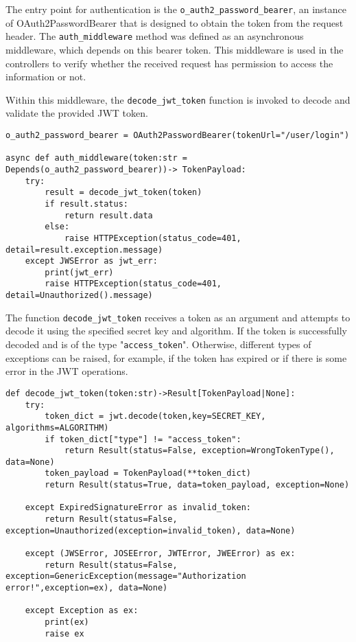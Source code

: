 The entry point for authentication is the \texttt{o\_auth2\_password\_bearer}, an instance of OAuth2PasswordBearer that is designed to obtain the token from the request header. The \texttt{auth\_middleware} method was defined as an asynchronous middleware, which depends on this bearer token. This middleware is used in the controllers to verify whether the received request has permission to access the information or not.

Within this middleware, the \texttt{decode\_jwt\_token} function is invoked to decode and validate the provided \gls{JWT} token.

\begin{Verbatim}[fontsize=\small, baselinestretch=0.6]
o_auth2_password_bearer = OAuth2PasswordBearer(tokenUrl="/user/login")

async def auth_middleware(token:str = Depends(o_auth2_password_bearer))-> TokenPayload:
    try:
        result = decode_jwt_token(token)
        if result.status:
            return result.data
        else:
            raise HTTPException(status_code=401, detail=result.exception.message)
    except JWSError as jwt_err:
        print(jwt_err)
        raise HTTPException(status_code=401, detail=Unauthorized().message)
\end{Verbatim}

The function \texttt{decode\_jwt\_token} receives a token as an argument and attempts to decode it using the specified secret key and algorithm. If the token is successfully decoded and is of the type "\texttt{access\_token}". Otherwise, different types of exceptions can be raised, for example, if the token has expired or if there is some error in the \gls{JWT} operations.

\begin{Verbatim}[fontsize=\small, baselinestretch=0.6]
def decode_jwt_token(token:str)->Result[TokenPayload|None]:
    try:
        token_dict = jwt.decode(token,key=SECRET_KEY, algorithms=ALGORITHM)
        if token_dict["type"] != "access_token":
            return Result(status=False, exception=WrongTokenType(), data=None)
        token_payload = TokenPayload(**token_dict)
        return Result(status=True, data=token_payload, exception=None)
    
    except ExpiredSignatureError as invalid_token:
        return Result(status=False, exception=Unauthorized(exception=invalid_token), data=None)

    except (JWSError, JOSEError, JWTError, JWEError) as ex:
        return Result(status=False, exception=GenericException(message="Authorization error!",exception=ex), data=None)

    except Exception as ex:
        print(ex)
        raise ex
\end{Verbatim}

